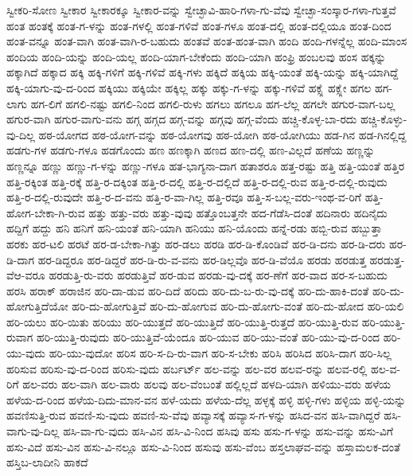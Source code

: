 {ಸ್ವೀಕರಿ-ಸೋಣ
ಸ್ವೀಕಾರ
ಸ್ವೀಕಾರಕ್ಕೂ
ಸ್ವೀಕಾರ-ವನ್ನು
ಸ್ವೇಚ್ಛಾವಿ-ಹಾರಿ-ಗಳಾ-ಗು-ವೆವು
ಸ್ವೇಚ್ಛಾ-ಸಂಸ್ಕಾರ-ಗಳಾ-ಗುತ್ತವೆ
ಹಂತ
ಹಂತಕ್ಕೆ
ಹಂತ-ಗ-ಳನ್ನು
ಹಂತ-ಗಳಲ್ಲಿ
ಹಂತ-ಗಳಿವೆ
ಹಂತ-ಗಳೂ
ಹಂತ-ದಲ್ಲಿ
ಹಂತ-ದಲ್ಲಿಯೂ
ಹಂತ-ದಿಂದ
ಹಂತ-ವನ್ನೂ
ಹಂತ-ವಾಗಿ
ಹಂತ-ವಾಗಿ-ರ-ಬಹುದು
ಹಂತವೆ
ಹಂತ-ಹಂತ-ವಾಗಿ
ಹಂದಿ
ಹಂದಿ-ಗಳನ್ನೆಲ್ಲ
ಹಂದಿ-ಮಾಂಸ
ಹಂದಿಯ
ಹಂದಿ-ಯನ್ನು
ಹಂದಿ-ಯಲ್ಲ
ಹಂದಿ-ಯಾಗ-ಬೇಕೆಂದು
ಹಂದಿ-ಯಾಗಿ
ಹಂಫ್ರಿ
ಹಂಬಲವು
ಹಂಸ
ಹಕ್ಕನ್ನು
ಹಕ್ಕಾಗಿದೆ
ಹಕ್ಕಾದ
ಹಕ್ಕಿ
ಹಕ್ಕಿ-ಗಳಿಗೆ
ಹಕ್ಕಿ-ಗಳಿವೆ
ಹಕ್ಕಿ-ಗಳು
ಹಕ್ಕಿದೆ
ಹಕ್ಕಿಯ
ಹಕ್ಕಿ-ಯಂತೆ
ಹಕ್ಕಿ-ಯನ್ನು
ಹಕ್ಕಿ-ಯಾಗಿದ್ದೆ
ಹಕ್ಕಿ-ಯಾಗು-ವು-ದ-ರಿಂದ
ಹಕ್ಕಿಯು
ಹಕ್ಕಿಯೇ
ಹಕ್ಕಿಲ್ಲ
ಹಕ್ಕು
ಹಕ್ಕು-ಗ-ಳನ್ನು
ಹಕ್ಕು-ಗಳಿವೆ
ಹಕ್ಸ್ಲೆ
ಹಕ್ಸ್ಲೇ
ಹಗಲ
ಹಗ-ಲಾಗು
ಹಗ-ಲಿಗೆ
ಹಗಲಿ-ನಷ್ಟು
ಹಗಲಿ-ನಿಂದ
ಹಗಲಿ-ರುಳು
ಹಗಲು
ಹಗಲೂ
ಹಗ-ಲೆಲ್ಲ
ಹಗಲೇ
ಹಗುರ-ವಾಗ-ಬಲ್ಲ
ಹಗುರ-ವಾಗಿ
ಹಗುರ-ವಾಗು-ವನು
ಹಗ್ಗ
ಹಗ್ಗದ
ಹಗ್ಗ-ವನ್ನು
ಹಗ್ಗವು
ಹಗ್ಗ-ವೆಂದು
ಹಚ್ಚಿ-ಕೊಳ್ಳ-ಬಾ-ರದು
ಹಚ್ಚಿ-ಕೊಳ್ಳು-ವು-ದಿಲ್ಲ
ಹಠ-ಯೋಗದ
ಹಠ-ಯೋಗ-ವನ್ನು
ಹಠ-ಯೋಗವು
ಹಠ-ಯೋಗಿ
ಹಠ-ಯೋಗಿಯು
ಹಡ-ಗಿನ
ಹಡ-ಗಿನಲ್ಲಿದ್ದ
ಹಡಗು-ಗಳ
ಹಡಗು-ಗಳೂ
ಹಡಗೊಂದು
ಹಣ
ಹಣಕ್ಕಾಗಿ
ಹಣದ
ಹಣ-ದಲ್ಲಿ
ಹಣ-ವಿಲ್ಲದೆ
ಹಣೆಯ
ಹಣ್ಣನ್ನು
ಹಣ್ಣನ್ನೂ
ಹಣ್ಣು
ಹಣ್ಣು-ಗ-ಳನ್ನು
ಹಣ್ಣು-ಗಳೂ
ಹತ-ಭಾಗ್ಯನಾ-ದಾಗ
ಹತಾಶರೂ
ಹತ್ತ-ರಷ್ಟು
ಹತ್ತಿ
ಹತ್ತಿ-ಯಂತೆ
ಹತ್ತಿರ
ಹತ್ತಿ-ರಕ್ಕಿಂತ
ಹತ್ತಿ-ರಕ್ಕೆ
ಹತ್ತಿ-ರ-ದಕ್ಕಿಂತ
ಹತ್ತಿ-ರ-ದಲ್ಲಿ
ಹತ್ತಿ-ರ-ದಲ್ಲಿದೆ
ಹತ್ತಿ-ರ-ದಲ್ಲಿ-ರುವ
ಹತ್ತಿ-ರ-ದಲ್ಲಿ-ರುವುದು
ಹತ್ತಿ-ರ-ದಲ್ಲಿ-ರುವುದೇ
ಹತ್ತಿ-ರ-ದ-ವನು
ಹತ್ತಿ-ರ-ವಾ-ಗಿಲ್ಲ
ಹತ್ತಿ-ರವೂ
ಹತ್ತಿ-ಸ-ಬಲ್ಲ-ವರು-ಇಂಥ-ವ-ರಿಗೆ
ಹತ್ತಿ-ಹೋಗ-ಬೇಕಾ-ಗಿ-ರುವ
ಹತ್ತು
ಹತ್ತು-ವರು
ಹತ್ತು-ವುವು
ಹತ್ತೊಂಬತ್ತನೇ
ಹದ-ಗೆಡೆಸಿ-ದಂತೆ
ಹದಿನಾರು
ಹದಿನೈದು
ಹದ್ದಿಗೆ
ಹದ್ದು
ಹನಿ
ಹನಿಗೆ
ಹನಿ-ಯಂತೆ
ಹನಿ-ಯಾಗಿ
ಹನಿಯು
ಹನಿ-ಯೊಂದು
ಹನ್ನೆ-ರಡು
ಹಬ್ಬಿ-ರುವ
ಹಬ್ಬುತ್ತಾ
ಹರಕು
ಹರ-ಟಲಿ
ಹರಟೆ
ಹರ-ಡ-ಬೇಕಾ-ಗಿತ್ತು
ಹರ-ಡಲು
ಹರಡಿ
ಹರ-ಡಿ-ಕೊಂಡಿವೆ
ಹರ-ಡಿ-ದನು
ಹರ-ಡಿ-ದರು
ಹರ-ಡಿ-ದಾಗ
ಹರ-ಡಿದ್ದರೂ
ಹರ-ಡಿದ್ದರೆ
ಹರ-ಡಿ-ರು-ವ-ವನು
ಹರ-ಡಿಲ್ಲವೊ
ಹರ-ಡಿ-ವೆಯೊ
ಹರಡು
ಹರಡುತ್ತ
ಹರಡುತ್ತ-ವೆಆ-ವರೂ
ಹರಡುತ್ತಿ-ರು-ವರು
ಹರಡುತ್ತಿವೆ
ಹರ-ಡುವ
ಹರಡು-ವು-ದಕ್ಕೆ
ಹರ-ಣೆಗೆ
ಹರ-ವಾದ
ಹರ-ಸ-ಬಹುದು
ಹರಸಿ
ಹರಾಕ್
ಹರಾಜಿನ
ಹರಿ-ದಾ-ಡುವ
ಹರಿ-ದಿದೆ
ಹರಿದು
ಹರಿ-ದು-ಬ-ರು-ವು-ದಕ್ಕೆ
ಹರಿ-ದು-ಹಾಕಿ-ದಂತೆ
ಹರಿ-ದು-ಹೋಗುತ್ತಿದೆಯೋ
ಹರಿ-ದು-ಹೋಗುತ್ತಿವೆ
ಹರಿ-ದು-ಹೋಗುವ
ಹರಿ-ದು-ಹೋಗು-ವಂತೆ
ಹರಿ-ದು-ಹೋದ
ಹರಿ-ಯಲಿ
ಹರಿ-ಯಲು
ಹರಿ-ಯಿತು
ಹರಿಯು
ಹರಿ-ಯುತ್ತದೆ
ಹರಿ-ಯುತ್ತಿದೆ
ಹರಿ-ಯುತ್ತಿ-ರುತ್ತದೆ
ಹರಿ-ಯುತ್ತಿ-ರುವ
ಹರಿ-ಯುತ್ತಿ-ರುವಾಗ
ಹರಿ-ಯುತ್ತಿ-ರುವುದು
ಹರಿ-ಯುತ್ತಿವೆ-ಯೆಂದೂ
ಹರಿ-ಯುವ
ಹರಿ-ಯು-ವಂತೆ
ಹರಿ-ಯು-ವು-ದ-ರಿಂದ
ಹರಿ-ಯು-ವುದು
ಹರಿ-ಯು-ವುದೋ
ಹರಿಸ
ಹರಿ-ಸ-ದಿ-ರು-ವಾಗ
ಹರಿ-ಸ-ಬೇಕು
ಹರಿಸಿ
ಹರಿಸಿದ
ಹರಿಸಿ-ದಾಗ
ಹರಿ-ಸಿಲ್ಲ
ಹರಿಸುವ
ಹರಿಸು-ವು-ದ-ರಿಂದ
ಹರಿಸು-ವುದು
ಹರ್ಬರ್ಟ್
ಹಲ-ವನ್ನು
ಹಲ-ವರ
ಹಲವ-ರನ್ನು
ಹಲವ-ರಲ್ಲಿ
ಹಲ-ವ-ರಿಗೆ
ಹಲ-ವರು
ಹಲ-ವಾಗಿ
ಹಲ-ವಾರು
ಹಲವು
ಹಲ-ವೆಂಬಂತೆ
ಹಲ್ಲಿಲ್ಲದೆ
ಹಳದಿ-ಯಾಗಿ
ಹಳಿಯು-ವರು
ಹಳೆಯ
ಹಳೆಯ-ದ-ರಿಂದ
ಹಳೆಯ-ದಿದು-ಮಾನ-ವನ
ಹಳೆ-ಯದು
ಹಳೆಯ-ದೆಲ್ಲ
ಹಳ್ಳಕ್ಕೆ
ಹಳ್ಳಿ
ಹಳ್ಳಿ-ಗಳು
ಹಳ್ಳಿಯ
ಹಳ್ಳಿ-ಯನ್ನು
ಹವಣಿಸುತ್ತಿ-ರುವ
ಹವಣಿ-ಸು-ವುದು
ಹವಣಿ-ಸು-ವೆವು
ಹವ್ಯಾಸಕ್ಕೆ
ಹವ್ಯಾಸ-ಗ-ಳನ್ನು
ಹಸಿದ-ವನ
ಹಸಿ-ವಾಗಿದ್ದರೆ
ಹಸಿ-ವಾಗು-ವು-ದಿಲ್ಲ
ಹಸಿ-ವಾ-ಗು-ವುದು
ಹಸಿ-ವಿನ
ಹಸಿ-ವಿ-ನಿಂದ
ಹಸಿವು
ಹಸು
ಹಸು-ಗ-ಳನ್ನು
ಹಸು-ವನ್ನು
ಹಸು-ವಿಗೆ
ಹಸು-ವಿದೆ
ಹಸು-ವಿನ
ಹಸು-ವಿ-ನಲ್ಲೂ
ಹಸು-ವಿ-ನಿಂದ
ಹಸುವು
ಹಸು-ವೆಂಬ
ಹಸ್ತಲಾಘವ-ವನ್ನು
ಹಸ್ತಾಮಲಕ-ದಂತೆ
ಹಸ್ತಿಬ-ಲಾದೀನಿ
ಹಾಕದೆ
}

